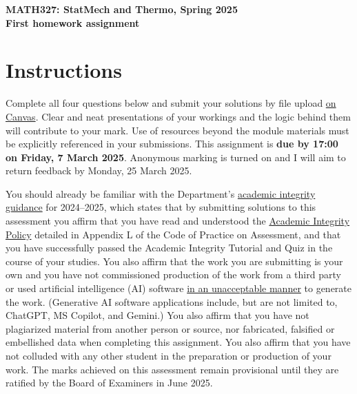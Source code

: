 \documentclass[12 pt]{article} %
\begin{document}
\newcommand{\thisweek}{MATH327 Homework 1}
\newcommand{\moddate}{Last modified 26 Feb.~2025}
\begin{center}
  {\Large \textbf{MATH327: StatMech and Thermo, Spring 2025}} \\[12 pt]
  {\Large \textbf{First homework assignment}} \\[24 pt]
\end{center}

\section*{Instructions}
Complete all four questions below and submit your solutions by file upload \href{https://canvas.liverpool.ac.uk/courses/76365/assignments/297933}{on Canvas}.
Clear and neat presentations of your workings and the logic behind them will contribute to your mark.
Use of resources beyond the module materials must be explicitly referenced in your submissions.
This assignment is \textbf{due by 17:00 on Friday, 7 March 2025}.
Anonymous marking is turned on and I will aim to return feedback by Monday, 25 March 2025.

You should already be familiar with the Department's \href{https://canvas.liverpool.ac.uk/courses/76365/files/11992667}{academic integrity guidance} for 2024--2025, which states that by submitting solutions to this assessment you affirm that you have read and understood the \href{https://www.liverpool.ac.uk/media/livacuk/tqsd/code-of-practice-on-assessment/appendix_L_cop_assess.pdf}{Academic Integrity Policy} detailed in Appendix L of the Code of Practice on Assessment, and that you have successfully passed the Academic Integrity Tutorial and Quiz in the course of your studies.
You also affirm that the work you are submitting is your own and you have not commissioned production of the work from a third party or used artificial intelligence (AI) software \href{https://www.liverpool.ac.uk/media/livacuk/centre-for-innovation-in-education/digital-education/generative-ai-teach-learn-assess/guidance-on-the-use-of-generative-ai.pdf}{in an unacceptable manner} to generate the work.
(Generative AI software applications include, but are not limited to, ChatGPT, MS Copilot, and Gemini.)
You also affirm that you have not plagiarized material from another person or source, nor fabricated, falsified or embellished data when completing this assignment.
You also affirm that you have not colluded with any other student in the preparation or production of your work.
The marks achieved on this assessment remain provisional until they are ratified by the Board of Examiners in June 2025.
\end{document}
